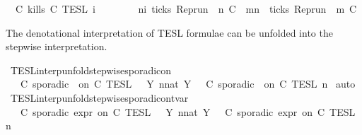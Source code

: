 \begin{isabellebody}
{\isacharbar}\ {\isacartoucheopen}{\isasymlbrakk}\ C\ kills\ C\ {\isasymrbrakk}\isactrlsub T\isactrlsub E\isactrlsub S\isactrlsub L\isactrlbsup {\isasymge}\ i\isactrlesup \ {\isacharequal}\isanewline
\ \ \ \ \ \ {\isacharbraceleft}{\isasymrho}{\isachardot}\ {\isasymforall}n{\isasymge}i{\isachardot}\ ticks\ {\isacharparenleft}{\isacharparenleft}Rep{\isacharunderscore}run\ {\isasymrho}{\isacharparenright}\ n\ C\ {\isasymlongrightarrow}\ {\isacharparenleft}{\isasymforall}m{\isasymge}n{\isachardot}\ {\isasymnot}\ ticks\ {\isacharparenleft}{\isacharparenleft}Rep{\isacharunderscore}run\ {\isasymrho}{\isacharparenright}\ m\ C%
\begin{isamarkuptext}%
The denotational interpretation of TESL formulae can be unfolded into the 
  stepwise interpretation.%
\end{isamarkuptext}\isamarkuptrue%
\isamarkupfalse%
\ TESL{\isacharunderscore}interp{\isacharunderscore}unfold{\isacharunderscore}stepwise{\isacharunderscore}sporadicon{\isacharcolon}\isanewline
\ \ {\isacartoucheopen}{\isasymlbrakk}\ C\ sporadic\ {\isasymtau}\ on\ C\ {\isasymrbrakk}\isactrlsub T\isactrlsub E\isactrlsub S\isactrlsub L\ {\isacharequal}\ {\isasymUnion}\ {\isacharbraceleft}Y{\isachardot}\ {\isasymexists}n{\isacharcolon}{\isacharcolon}nat{\isachardot}\ Y\ {\isacharequal}\ {\isasymlbrakk}\ C\ sporadic\ {\isasymtau}\ on\ C\ {\isasymrbrakk}\isactrlsub T\isactrlsub E\isactrlsub S\isactrlsub L\isactrlbsup {\isasymge}\ n\isactrlesup {\isacharbraceright}{\isacartoucheclose}\isanewline
%
\isadelimproof
%
\endisadelimproof
%
\isatagproof
{}\isamarkupfalse%
\ auto%
\endisatagproof
{\isafoldproof}%
%
\isadelimproof
\isanewline
%
\endisadelimproof
\isanewline
{}\isamarkupfalse%
\ TESL{\isacharunderscore}interp{\isacharunderscore}unfold{\isacharunderscore}stepwise{\isacharunderscore}sporadicon{\isacharunderscore}tvar{\isacharcolon}\isanewline
\ \ {\isacartoucheopen}{\isasymlbrakk}\ C\ sporadic{\isasymsharp}\ {\isasymtau}\isactrlsub e\isactrlsub x\isactrlsub p\isactrlsub r\ on\ C\ {\isasymrbrakk}\isactrlsub T\isactrlsub E\isactrlsub S\isactrlsub L\ {\isacharequal}\ {\isasymUnion}\ {\isacharbraceleft}Y{\isachardot}\ {\isasymexists}n{\isacharcolon}{\isacharcolon}nat{\isachardot}\ Y\ {\isacharequal}\ {\isasymlbrakk}\ C\ sporadic{\isasymsharp}\ {\isasymtau}\isactrlsub e\isactrlsub x\isactrlsub p\isactrlsub r\ on\ C\ {\isasymrbrakk}\isactrlsub T\isactrlsub E\isactrlsub S\isactrlsub L\isactrlbsup {\isasymge}\ n\isactrlesup {\isacharbraceright}{\isacartoucheclose}\isanewline

\end{isabellebody}
